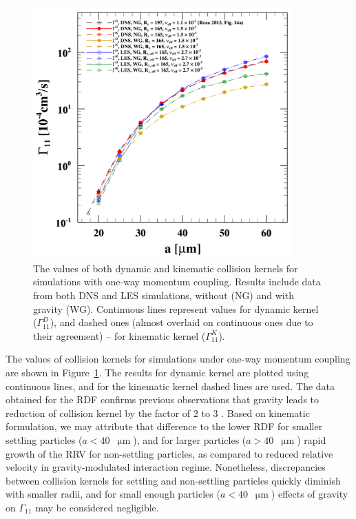 \documentclass{pracamgren}
\begin{document}
\begin{figure}[h]
\centering
\includegraphics[width=10cm]{img/plots/2-2-2-owcgamma.pdf}
\caption{
The values of both dynamic and kinematic collision kernels for simulations with one-way momentum coupling.
Results include data from both DNS and LES simulations, without (NG) and with gravity (WG).
Continuous lines represent values for dynamic kernel ($\Gamma_{11}^D$), and dashed ones (almost overlaid on continuous ones due to their agreement) -- for kinematic kernel ($\Gamma_{11}^K$). 
}
\label{fig:owcgamma}
\end{figure}

The values of collision kernels for simulations under one-way momentum coupling are shown in Figure~\ref{fig:owcgamma}.
The results for dynamic kernel are plotted using continuous lines, and for the kinematic kernel dashed lines are used.
The data obtained for the RDF confirms previous observations that gravity leads to reduction of collision kernel by the factor of $2$ to $3$ \parencite{Rosa2013}.
Based on kinematic formulation, we may attribute that difference to the lower RDF for smaller settling particles ($a  < 40$~$\upmu\text{m}$), and for larger particles ($a  > 40$~$\upmu\text{m}$) rapid growth of the RRV for non-settling particles, as compared to reduced relative velocity in gravity-modulated interaction regime.
Nonetheless, discrepancies between collision kernels for settling and non-settling particles quickly diminish with smaller radii, and for small enough particles ($a < 40$~$\upmu\text{m}$) effects of gravity on $\Gamma_{11}$ may be considered negligible.
\end{document}

